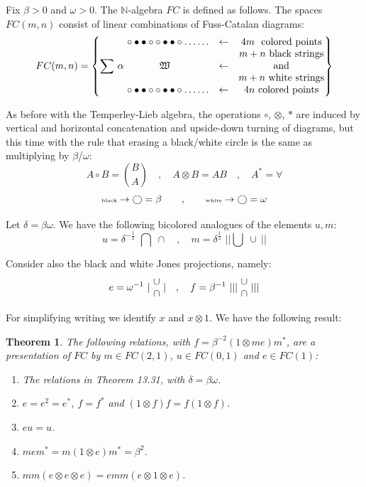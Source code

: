 \documentclass[12pt]{amsbook}
\newtheorem{theorem}{Theorem}[chapter]
\begin{document}
Fix $\beta>0$ and $\omega>0$. The $\mathbb N$-algebra $FC$ is defined as follows. The spaces $FC(m,n)$ consist of linear combinations of Fuss-Catalan diagrams:
$$FC(m,n)=\left\{\sum\,\alpha\,\,
\begin{matrix}\circ\bullet\bullet\circ\circ\bullet\bullet\circ\ldots\ldots&\leftarrow&4m\,\,\ {\rm colored\ points}\\
\ &\ &m+n {\rm\ black\ strings}\\
\mathfrak{W}\mbox{\ \ }&\leftarrow&{\rm and}\\
\ & \ & m+n{\rm\ white\ strings}\\
\circ\bullet\bullet\circ\circ\bullet\bullet\circ\ldots\ldots&\leftarrow&4n\,\,{\rm colored\ points}\end{matrix}\right\}$$

As before with the Temperley-Lieb algebra, the operations $\circ$, $\otimes$, $*$ are induced by vertical and horizontal concatenation and upside-down turning of diagrams, but this time with the rule that erasing a black/white circle is the same as multiplying by $\beta$/$\omega$:
$$A\circ B=\binom{B}{A}\quad,\quad 
A\otimes B=AB\quad,\quad 
A^*=\forall$$
$$\mbox{\tiny{black}}\rightarrow\bigcirc=\beta
\qquad,\qquad
\mbox{\tiny{white}}\rightarrow\bigcirc=\omega$$

Let $\delta=\beta\omega$. We have the following bicolored analogues of the elements $u,m$:
$$u=\delta^{-\frac{1}{2}}\,\,\bigcap\;\!\!\!\!\!\!\!\!\cap
\quad,\quad
m=\delta^{\frac{1}{2}}\,\,||\bigcup\;\!\!\!\!\!\!\!\!\cup\ ||$$

Consider also the black and white Jones projections, namely:
$$e=\omega^{-1}\,\,|\ \begin{matrix}\cup\cr\cap\end{matrix}\ |
\quad,\quad 
f=\beta^{-1}\,\,|||\ \begin{matrix}\cup\cr\cap\end{matrix}\ |||$$

For simplifying writing we identify $x$ and $x\otimes 1$. We have the following result:

\begin{theorem}
The following relations, with $f=\beta^{-2}(1\otimes me)m^*$, are a presentation of $FC$ by $m\in FC(2,1)$, $u\in FC(0,1)$ and $e\in FC(1)$:
\begin{enumerate}
\item The relations in Theorem 13.31, with $\delta =\beta\omega$.

\item $e=e^2=e^*$, $f=f^*$ and $(1\otimes f)f=f(1\otimes f)$.

\item $eu=u$.

\item $mem^*=m(1\otimes e)m^*=\beta^2$.

\item $mm(e\otimes e\otimes e)=emm(e\otimes1\otimes e)$.
\end{enumerate}
\end{theorem}
\end{document}
